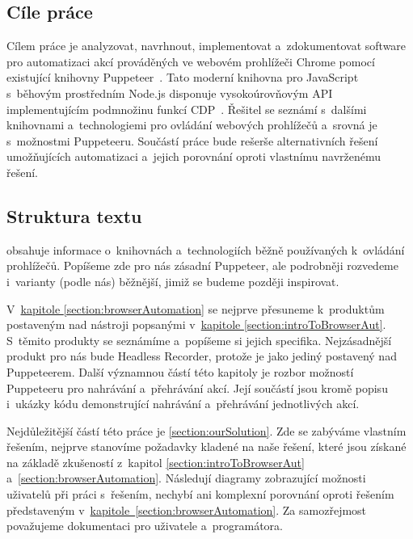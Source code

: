 \documentclass[12pt, a4paper, twoside]{article}
\begin{document}
	\subsection{Cíle práce}
	Cílem práce je analyzovat, navrhnout, implementovat a~zdokumentovat software pro automatizaci akcí prováděných ve webovém prohlížeči Chrome pomocí existující knihovny Puppeteer~\cite{puppeteerApi}.
	Tato moderní knihovna pro JavaScript s~běhovým prostředním Node.js disponuje vysokoúrovňovým API implementujícím podmnožinu funkcí CDP~\cite{devtoolsProtocol}.
	Řešitel se seznámí s~dalšími knihovnami a~technologiemi pro ovládání webových prohlížečů a~srovná je s~možnostmi Puppeteeru.
	Součástí práce bude rešerše alternativních řešení umožňujících automatizaci a~jejich porovnání oproti vlastnímu navrženému řešení.
	\subsection{Struktura textu}
	 obsahuje informace o~knihovnách a~technologiích běžně používaných k~ovládání prohlížečů. Popíšeme zde pro nás zásadní Puppeteer, ale podrobněji rozvedeme i~varianty (podle nás) běžnější, jimiž se budeme později inspirovat.
	
	V~\hyperref[section:browserAutomation]{kapitole \ref{section:browserAutomation}} se nejprve přesuneme k~produktům postaveným nad nástroji popsanými v~\hyperref[section:introToBrowserAut]{kapitole \ref{section:introToBrowserAut}}. S~těmito produkty se seznámíme a~popíšeme si jejich specifika. Nejzásadnější produkt pro nás bude Headless Recorder, protože je jako jediný postavený nad Puppeteerem. Další významnou částí této kapitoly je rozbor možností Puppeteeru pro nahrávání a~přehrávání akcí. Její součástí jsou kromě popisu i~ukázky kódu demonstrující nahrávání a~přehrávání jednotlivých akcí.
	
	Nejdůležitější částí této práce je \cref{section:ourSolution}. Zde se zabýváme vlastním řešením, nejprve stanovíme požadavky kladené na naše řešení, které jsou získané na základě zkušeností z~kapitol \ref{section:introToBrowserAut} a~\ref{section:browserAutomation}. Následují diagramy zobrazující možnosti uživatelů při práci s~řešením, nechybí ani komplexní porovnání oproti řešením představeným v~\hyperref[section:browserAutomation]{kapitole~\ref{section:browserAutomation}}. Za samozřejmost považujeme dokumentaci pro uživatele a~programátora.
\end{document}
